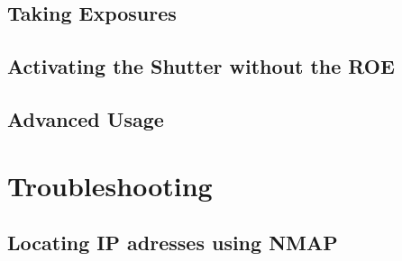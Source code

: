 \documentclass[10pt,a4paper,titlepage]{article}
\begin{document}
\subsection{Taking Exposures}
\subsection{Activating the Shutter without the ROE}
\subsection{Advanced Usage}

\section{Troubleshooting}
\subsection{Locating IP adresses using NMAP}
\end{document}
